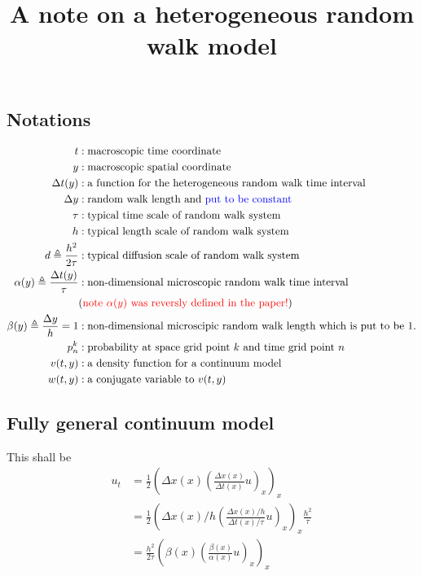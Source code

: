 \documentclass[a4paper,11pt]{article}
\def\red{\color{red}}
\def\blue{\color{blue}}
\def\t{{\tau}}
\def\l{{h}}
\theoremstyle{remark}
\begin{document}
\title{A note on a heterogeneous random walk model}
\date{}

\maketitle




\subsection{Notations}
\begin{align*}
 t &: \text{macroscopic time coordinate}\\
 y &: \text{macroscopic spatial coordinate}\\
 \Delta t(y) &: \text{a function for the heterogeneous random walk time interval}\\
 \Delta y &: \text{random walk length and {\blue put to be constant}}\\
 \tau &: \text{typical time scale of random walk system}\\
 h &: \text{typical length scale of random walk system}\\
 d \triangleq \frac{\l^2}{2\tau} &: \text{typical diffusion scale of random walk system}\\
 \alpha(y) \triangleq \frac{\Delta t(y)}{\tau} &: \text{non-dimensional microscopic random walk time interval}\\
 & \text{({\red note $\alpha(y)$ was reversly defined in the paper!})}\\
 \beta(y) \triangleq \frac{\Delta y}{\l} = 1 &: \text{non-dimensional microscipic random walk length which is put to be $1$.}\\
 p^k_n &: \text{probability at space grid point $k$ and time grid point $n$}\\
 v(t,y) &: \text{a density function for a continuum model}\\
 w(t,y) &: \text{a conjugate variable to $v(t,y)$}\\
\end{align*}

\subsection{Fully general continuum model}
This shall be
\begin{align*}
 u_t &= \frac{1}{2} \left( \Delta x(x) \left( \frac{\Delta x(x)}{\Delta t(x)} u \right)_x\right)_x\\
 &= \frac{1}{2} \left( \Delta x(x)/\l \left( \frac{\Delta x(x)/\l}{\Delta t(x)/\t} u \right)_x\right)_x \frac{\l^2}{\t} \\
 &=  \frac{\l^2}{2\t} \left( \beta(x) \left( \frac{\beta(x)}{\alpha(x)} u \right)_x\right)_x
\end{align*}
\end{document}
